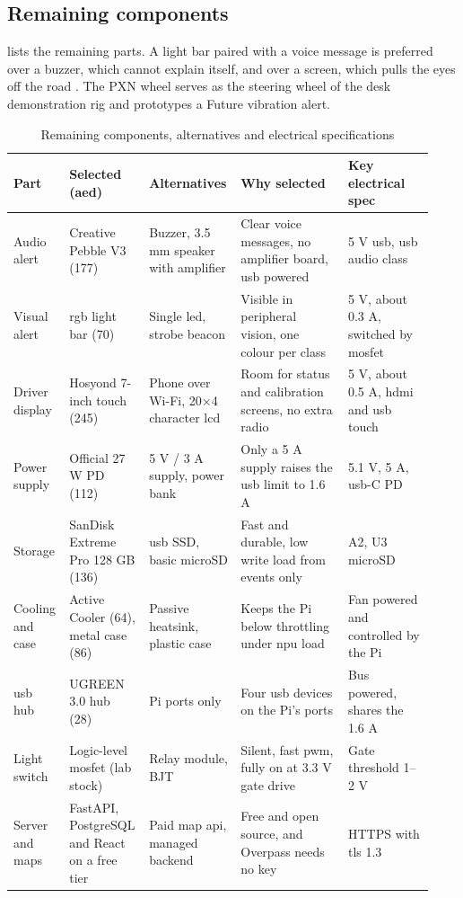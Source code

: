 \subsection{Remaining components}

 lists the remaining parts. A light bar paired with a voice message is preferred over a buzzer, which cannot explain itself, and over a screen, which pulls the eyes off the road \cite{r20,r22}. The PXN wheel serves as the steering wheel of the desk demonstration rig and prototypes a Future vibration alert.

\begin{table}[htbp]
\centering
\caption{Remaining components, alternatives and electrical specifications}
\label{tab:ch4-parts}
\footnotesize
\setlength{\tabcolsep}{3pt}
\renewcommand{\arraystretch}{1.15}
\begin{tabular}{|p{0.120\linewidth}|p{0.170\linewidth}|p{0.190\linewidth}|p{0.250\linewidth}|p{0.200\linewidth}|}
\hline
\textbf{Part} & \textbf{Selected (\gls{aed})} & \textbf{Alternatives} & \textbf{Why selected} & \textbf{Key electrical spec} \\
\hline
Audio alert & Creative Pebble V3 (177) & Buzzer, 3.5 mm speaker with amplifier & Clear voice messages, no amplifier board, \gls{usb} powered & 5 V \gls{usb}, \gls{usb} audio class \\
\hline
Visual alert & \gls{rgb} light bar (70) & Single \gls{led}, strobe beacon & Visible in peripheral vision, one colour per class & 5 V, about 0.3 A, switched by \gls{mosfet} \\
\hline
Driver display & Hosyond 7-inch touch (245) & Phone over Wi-Fi, 20$\times$4 character \gls{lcd} & Room for status and calibration screens, no extra radio & 5 V, about 0.5 A, \gls{hdmi} and \gls{usb} touch \\
\hline
Power supply & Official 27 W PD (112) & 5 V / 3 A supply, power bank & Only a 5 A supply raises the \gls{usb} limit to 1.6 A & 5.1 V, 5 A, \gls{usb}-C PD \\
\hline
Storage & SanDisk Extreme Pro 128 GB (136) & \gls{usb} SSD, basic microSD & Fast and durable, low write load from events only & A2, U3 microSD \\
\hline
Cooling and case & Active Cooler (64), metal case (86) & Passive heatsink, plastic case & Keeps the Pi below throttling under \gls{npu} load & Fan powered and controlled by the Pi \\
\hline
\gls{usb} hub & UGREEN 3.0 hub (28) & Pi ports only & Four \gls{usb} devices on the Pi's ports & Bus powered, shares the 1.6 A \\
\hline
Light switch & Logic-level \gls{mosfet} (lab stock) & Relay module, BJT & Silent, fast \gls{pwm}, fully on at 3.3 V gate drive & Gate threshold 1--2 V \\
\hline
Server and maps & FastAPI, PostgreSQL and React on a free tier & Paid map \gls{api}, managed backend & Free and open source, and Overpass needs no key \cite{r68} & HTTPS with \gls{tls} 1.3 \\
\hline
\end{tabular}
\end{table}




